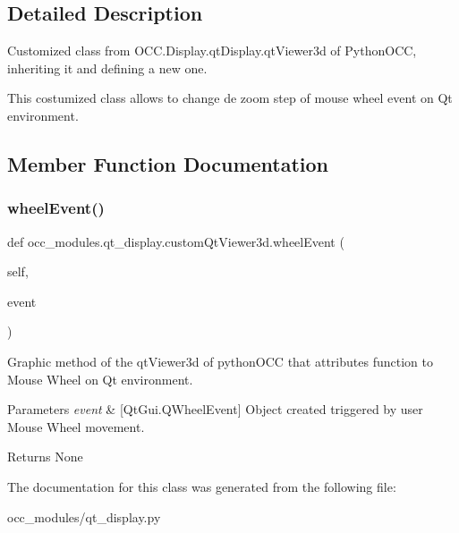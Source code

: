 \subsection{Detailed Description}
Customized class from O\+C\+C.\+Display.\+qt\+Display.\+qt\+Viewer3d of Python\+O\+CC, inheriting it and defining a new one. 

This costumized class allows to change de zoom step of mouse wheel event on Qt environment. 

\subsection{Member Function Documentation}
\hypertarget{a00091_a2031b7d19b3a0c4b0f54fc90218bcdd8}{}\label{a00091_a2031b7d19b3a0c4b0f54fc90218bcdd8} 
\subsubsection{\texorpdfstring{wheel\+Event()}{wheelEvent()}}
{\footnotesize\ttfamily def occ\+\_\+modules.\+qt\+\_\+display.\+custom\+Qt\+Viewer3d.\+wheel\+Event (\begin{DoxyParamCaption}\item[{}]{self,  }\item[{}]{event }\end{DoxyParamCaption})}



Graphic method of the qt\+Viewer3d of python\+O\+CC that attributes function to Mouse Wheel on Qt environment. 


\begin{DoxyParams}{Parameters}
{\em event} & \mbox{[}Qt\+Gui.\+Q\+Wheel\+Event\mbox{]} Object created triggered by user Mouse Wheel movement. \\
\hline
\end{DoxyParams}
\begin{DoxyReturn}{Returns}
None 
\end{DoxyReturn}


The documentation for this class was generated from the following file\+:\begin{DoxyCompactItemize}
\item 
occ\+\_\+modules/qt\+\_\+display.\+py\end{DoxyCompactItemize}

